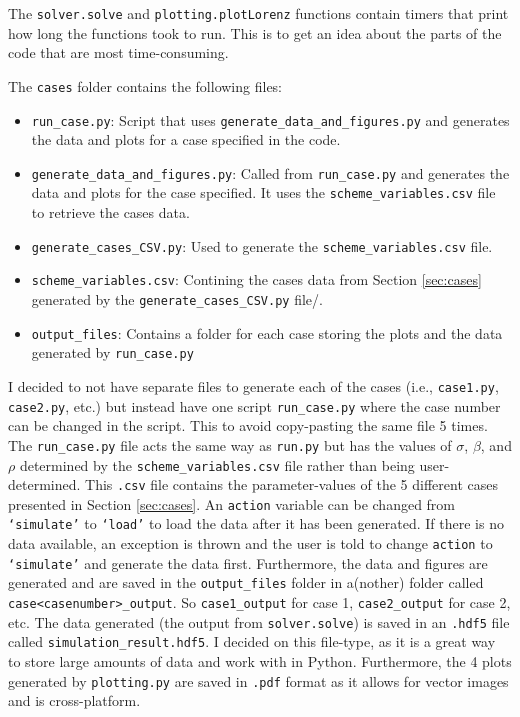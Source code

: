 \documentclass{article}
\def\code#1{\texttt{#1}}
\begin{document}
The \code{solver.solve} and \code{plotting.plotLorenz} functions contain timers that print how long the functions took to run. This is to get an idea about the parts of the code that are most time-consuming.
\vspace{1em}

The \code{cases} folder contains the following files:
\begin{itemize}
    \item \code{run\_case.py}: Script that uses \code{generate\_data\_and\_figures.py} and generates the data and plots for a case specified in the code.
    \item \code{generate\_data\_and\_figures.py}: Called from \code{run\_case.py} and generates the data and plots for the case specified. It uses the \code{scheme\_variables.csv} file to retrieve the cases data.
    \item \code{generate\_cases\_CSV.py}: Used to generate the \code{scheme\_variables.csv} file.
    \item \code{scheme\_variables.csv}: Contining the cases data from Section \ref{sec:cases} generated by the  \code{generate\allowbreak\_cases\_CSV.py} file/.
    \item \code{output\_files}: Contains a folder for each case storing the plots and the data generated by \code{run\_case.py}
\end{itemize}
\vspace{1em}
I decided to not have separate files to generate each of the cases (i.e., \code{case1.py}, \code{case2.py}, etc.) but instead have one script \code{run\_case.py} where the case number can be changed in the script. This to avoid copy-pasting the same file 5 times. The \code{run\_case.py} file acts the same way as \code{run.py} but has the values of $\sigma$, $\beta$, and $\rho$ determined by the \code{scheme\_variables.csv} file rather than being user-determined. This \code{.csv} file contains the parameter-values of the 5 different cases presented in Section \ref{sec:cases}. An \code{action} variable can be changed from \code{`simulate'} to \code{`load'} to load the data after it has been generated. If there is no data available, an exception is thrown and the user is told to change \code{action} to \code{`simulate'} and generate the data first. Furthermore, the data and figures are generated and are saved in the \code{output\_files} folder in a(nother) folder called \code{case<casenumber>\_output}. So \code{case1\_output} for case 1, \code{case2\_output} for case 2, etc. The data generated (the output from \code{solver.solve}) is saved in an \code{.hdf5} file called \code{simulation\_result.hdf5}. I decided on this file-type, as it is a great way to store large amounts of data and work with in Python. Furthermore, the 4 plots generated by \code{plotting.py} are saved in \code{.pdf} format as it allows for vector images and is cross-platform. 
\end{document}
